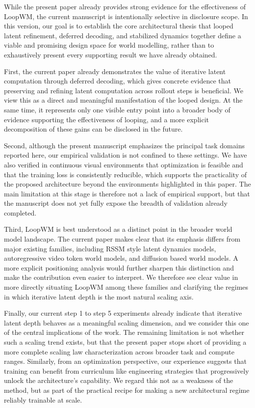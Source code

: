 While the present paper already provides strong evidence for the effectiveness of LoopWM, the current manuscript is intentionally selective in disclosure scope. In this version, our goal is to establish the core architectural thesis that looped latent refinement, deferred decoding, and stabilized dynamics together define a viable and promising design space for world modelling, rather than to exhaustively present every supporting result we have already obtained.
\par
First, the current paper already demonstrates the value of iterative latent computation through deferred decoding, which gives concrete evidence that preserving and refining latent computation across rollout steps is beneficial. We view this as a direct and meaningful manifestation of the looped design. At the same time, it represents only one visible entry point into a broader body of evidence supporting the effectiveness of looping, and a more explicit decomposition of these gains can be disclosed in the future.
\par
Second, although the present manuscript emphasizes the principal task domains reported here, our empirical validation is not confined to these settings. We have also verified in continuous visual environments that optimization is feasible and that the training loss is consistently reducible, which supports the practicality of the proposed architecture beyond the environments highlighted in this paper. The main limitation at this stage is therefore not a lack of empirical support, but that the manuscript does not yet fully expose the breadth of validation already completed.
\par
Third, LoopWM is best understood as a distinct point in the broader world model landscape. The current paper makes clear that its emphasis differs from major existing families, including RSSM style latent dynamics models, autoregressive video token world models, and diffusion based world models. A more explicit positioning analysis would further sharpen this distinction and make the contribution even easier to interpret. We therefore see clear value in more directly situating LoopWM among these families and clarifying the regimes in which iterative latent depth is the most natural scaling axis.
\par
Finally, our current step 1 to step 5 experiments already indicate that iterative latent depth behaves as a meaningful scaling dimension, and we consider this one of the central implications of the work. The remaining limitation is not whether such a scaling trend exists, but that the present paper stops short of providing a more complete scaling law characterization across broader task and compute ranges. Similarly, from an optimization perspective, our experience suggests that training can benefit from curriculum like engineering strategies that progressively unlock the architecture’s capability. We regard this not as a weakness of the method, but as part of the practical recipe for making a new architectural regime reliably trainable at scale.
